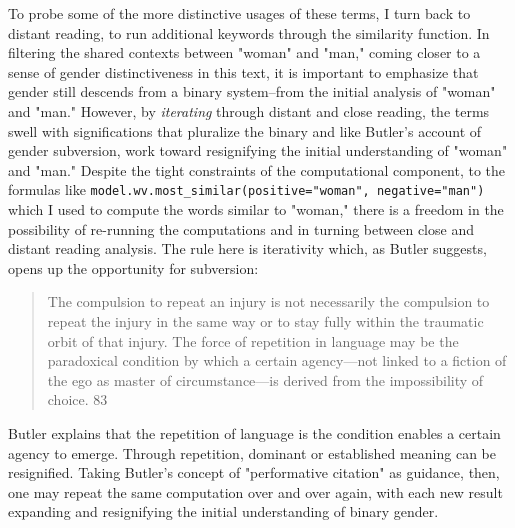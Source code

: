 \documentclass[11pt]{article}
\begin{document}
To probe some of the more distinctive usages of these terms, I turn
back to distant reading, to run additional keywords through the
similarity function. In filtering the shared contexts between "woman"
and "man," coming closer to a sense of gender distinctiveness in this
text, it is important to emphasize that gender still descends from a
binary system--from the initial analysis of "woman" and "man."
However, by \emph{iterating} through distant and close reading, the terms
swell with significations that pluralize the binary and like Butler's
account of gender subversion, work toward resignifying the initial
understanding of "woman" and "man." Despite the tight constraints of
the computational component, to the formulas like
\texttt{model.wv.most\_similar(positive="woman", negative="man")} which I used
to compute the words similar to "woman," there is a freedom in the
possibility of re-running the computations and in turning between
close and distant reading analysis. The rule here is iterativity
which, as Butler suggests, opens up the opportunity for subversion:
\begin{quote}
The compulsion to repeat an injury is not necessarily the compulsion
to repeat the injury in the same way or to stay fully within the
traumatic orbit of that injury. The force of repetition in language
may be the paradoxical condition by which a certain agency---not
linked to a fiction of the ego as master of circumstance---is derived
from the impossibility of choice. 83 
\end{quote}
Butler explains that the repetition of language is the condition
enables a certain agency to emerge. Through repetition, dominant or
established meaning can be resignified. Taking Butler's concept of
"performative citation" as guidance, then, one may repeat the same
computation over and over again, with each new result expanding and
resignifying the initial understanding of binary gender.
\end{document}
